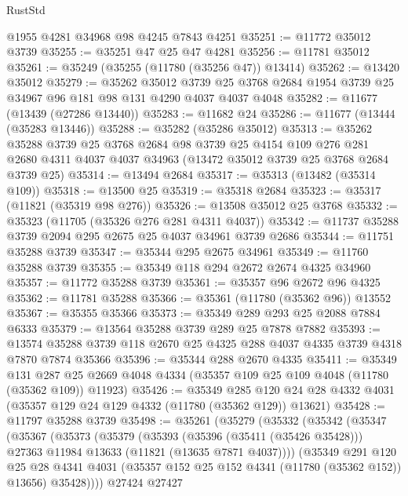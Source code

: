 \begin{lexlean}{RustStd}
\begin{coremodule}
    @1955
    @4281
    @34968
    @98
    @4245
    @7843
    @4251
@35251 := @11772 @35012 @3739
@35255 := @35251 @47 @25 @47 @4281
@35256 := @11781 @35012
@35261 := @35249 (@35255 (@11780 (@35256 @47)) @13414)
@35262 := @13420 @35012
@35279 := @35262
    @35012
    @3739
    @25
    @3768
    @2684
    @1954
    @3739
    @25
    @34967
    @96
    @181
    @98
    @131
    @4290
    @4037
    @4037
    @4048
@35282 := @11677 (@13439 (@27286 @13440))
@35283 := @11682 @24
@35286 := @11677 (@13444 (@35283 @13446))
@35288 := @35282 (@35286 @35012)
@35313 := @35262
    @35288
    @3739
    @25
    @3768
    @2684
    @98
    @3739
    @25
    @4154
    @109
    @276
    @281
    @2680
    @4311
    @4037
    @4037
    @34963
    (@13472 @35012 @3739 @25 @3768 @2684 @3739 @25)
@35314 := @13494 @2684
@35317 := @35313 (@13482 (@35314 @109))
@35318 := @13500 @25
@35319 := @35318 @2684
@35323 := @35317 (@11821 (@35319 @98 @276))
@35326 := @13508 @35012 @25 @3768
@35332 := @35323 (@11705 (@35326 @276 @281 @4311 @4037))
@35342 := @11737 @35288 @3739 @2094 @295 @2675 @25 @4037 @34961 @3739 @2686
@35344 := @11751 @35288 @3739
@35347 := @35344 @295 @2675 @34961
@35349 := @11760 @35288 @3739
@35355 := @35349 @118 @294 @2672 @2674 @4325 @34960
@35357 := @11772 @35288 @3739
@35361 := @35357 @96 @2672 @96 @4325
@35362 := @11781 @35288
@35366 := @35361 (@11780 (@35362 @96)) @13552
@35367 := @35355 @35366
@35373 := @35349 @289 @293 @25 @2088 @7884 @6333
@35379 := @13564 @35288 @3739 @289 @25 @7878 @7882
@35393 := @13574 @35288 @3739 @118 @2670 @25 @4325 @288 @4037 @4335 @3739 @4318 @7870 @7874 @35366
@35396 := @35344 @288 @2670 @4335
@35411 := @35349
    @131
    @287
    @25
    @2669
    @4048
    @4334
    (@35357 @109 @25 @109 @4048 (@11780 (@35362 @109)) @11923)
@35426 := @35349
    @285
    @120
    @24
    @28
    @4332
    @4031
    (@35357 @129 @24 @129 @4332 (@11780 (@35362 @129)) @13621)
@35428 := @11797 @35288 @3739
@35498 := @35261
    (@35279
      (@35332
        (@35342
          (@35347
            (@35367
              (@35373
                (@35379
                  (@35393
                    (@35396 (@35411 (@35426 @35428)))
                    @27363
                    @11984
                    @13633
                    (@11821 (@13635 @7871 @4037))))
                (@35349
                  @291
                  @120
                  @25
                  @28
                  @4341
                  @4031
                  (@35357 @152 @25 @152 @4341 (@11780 (@35362 @152)) @13656)
                  @35428))))
          @27424
          @27427

\end{coremodule}
\end{lexlean}

